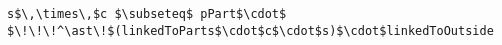 \lstset{frame=tb, aboveskip=12pt, belowskip=-3pt, breaklines=true, basicstyle=\small\ttfamily, tabsize=2, mathescape=true}
\begin{lstlisting}[caption={wellformed\_components.als, lines 66-66}, label=alloy:WF_PART_NO_ISLANDS, captionpos=b]
s$\,\times\,$c $\subseteq$ pPart$\cdot$ $\!\!\!^\ast\!$(linkedToParts$\cdot$c$\cdot$s)$\cdot$linkedToOutside
\end{lstlisting}